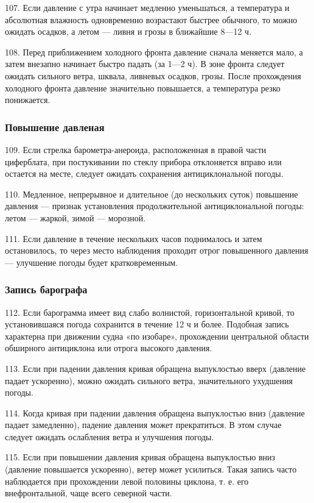 107. Если давление с утра начинает медленно уменьшаться, а температура и абсолютная влажность одновременно возрастают быстрее обычного, то можно ожидать осадков, а летом — ливня и грозы в ближайшие 8—12 ч.

108. Перед приближением холодного фронта давление сначала меняется мало, а затем внезапно начинает быстро падать (за 1—2 ч). В зоне фронта следует ожидать сильного ветра, шквала, ливневых осадков, грозы. После прохождения холодного фронта давление значительно повышается, а температура резко понижается.

\subsubsection{Повышение давленая}

109. Если стрелка барометра-анероида, расположенная в правой части циферблата, при постукивании по стеклу прибора отклоняется вправо или остается на месте, следует ожидать сохранения антициклональной погоды.

110. Медленное, непрерывное и длительное (до нескольких суток) повышение давления — признак установления продолжительной антициклональной погоды: летом — жаркой, зимой — морозной.

111. Если давление в течение нескольких часов поднималось и затем остановилось, то через место наблюдения проходит отрог повышенного давления — улучшение погоды будет кратковременным.

\subsubsection{Запись барографа}

112. Если барограмма имеет вид слабо волнистой, горизонтальной кривой, то установившаяся погода сохранится в течение 12 ч и более. Подобная запись характерна при движении судна «по изобаре», прохождении центральной области обширного антициклона или отрога высокого давления.

113. Если при падении давления кривая обращена выпуклостью вверх (давление падает ускоренно), можно ожидать сильного ветра, значительного ухудшения погоды.

114. Когда кривая при падении давления обращена выпуклостью вниз (давление падает замедленно), падение давления может прекратиться. В этом случае следует ожидать ослабления ветра и улучшения погоды.

115. Если при повышении давления кривая обращена выпуклостью вниз (давление повышается ускоренно), ветер может усилиться. Такая запись часто наблюдается при прохождении левой половины циклона, т. е. его внефронтальной, чаще всего северной части.

